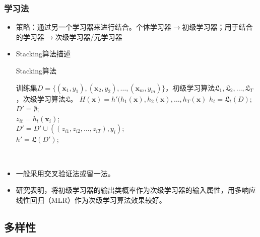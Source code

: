 \documentclass{ctexart}
\begin{document}
 					\subsubsection{学习法}
 						\begin{itemize}
 							\item 策略：通过另一个学习器来进行结合。个体学习器$\rightarrow$初级学习器；用于结合的学习器$\rightarrow$次级学习器/元学习器
 							\item Stacking算法描述\begin{algorithm}
 								\caption{Stacking算法}
 								\begin{algorithmic}[1]
 									\REQUIRE 训练集$D=\{(\bm{x}_1,y_1),(\bm{x}_2,y_2),\dots,(\bm{x}_m,y_m)\}$，初级学习算法$\mathfrak{L}_1,\mathfrak{L}_2,\dots,\mathfrak{L}_T$，次级学习算法$\mathfrak{L}$。
 									\ENSURE $H(\bm{x})=h'(h_1(\bm{x}),h_2(\bm{x}),\dots,h_T(\bm{x})$
 										\STATE $h_t=\mathfrak{L}_t(D)$;\\
 									\ENDFOR
 									\STATE $D'=\emptyset$;\\
 											\STATE $z_{it}=h_t(\bm{x}_i)$;\\
 										\ENDFOR
 										\STATE $D'=D'\cup((z_{i1},z_{i2},\dots,z_{iT}),y_i)$;\\
 									\ENDFOR
 									\STATE $h'=\mathfrak{L}(D')$;
 								\end{algorithmic} 
 							\end{algorithm}
 							\item 一般采用交叉验证法或留一法。
 							\item 研究表明，将初级学习器的输出类概率作为次级学习器的输入属性，用多响应线性回归（MLR）作为次级学习算法效果较好。
 						\end{itemize}
 				\subsection{多样性}
\end{document}
